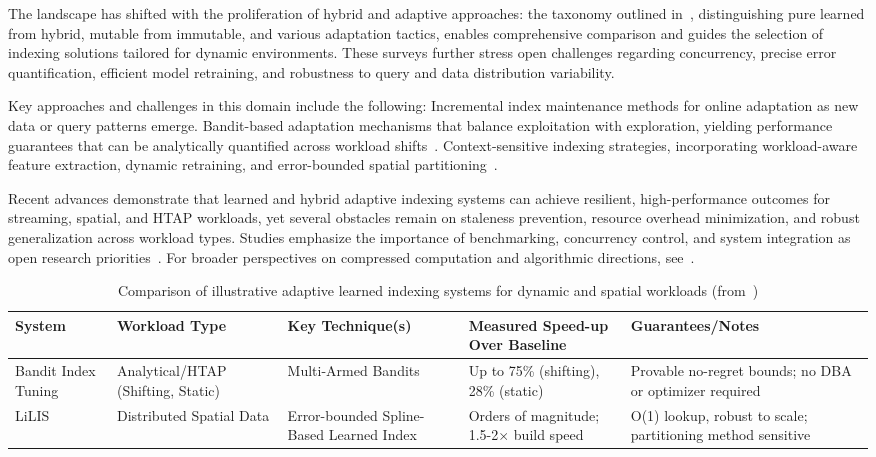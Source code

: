 \documentclass[sigconf]{acmart}
\begin{document}
The landscape has shifted with the proliferation of hybrid and adaptive approaches: the taxonomy outlined in~\cite{ref110}, distinguishing pure learned from hybrid, mutable from immutable, and various adaptation tactics, enables comprehensive comparison and guides the selection of indexing solutions tailored for dynamic environments. These surveys further stress open challenges regarding concurrency, precise error quantification, efficient model retraining, and robustness to query and data distribution variability.

Key approaches and challenges in this domain include the following:
Incremental index maintenance methods for online adaptation as new data or query patterns emerge.
Bandit-based adaptation mechanisms that balance exploitation with exploration, yielding performance guarantees that can be analytically quantified across workload shifts~\cite{ref105}.
Context-sensitive indexing strategies, incorporating workload-aware feature extraction, dynamic retraining, and error-bounded spatial partitioning~\cite{ref111,ref110}.

Recent advances demonstrate that learned and hybrid adaptive indexing systems can achieve resilient, high-performance outcomes for streaming, spatial, and HTAP workloads, yet several obstacles remain on staleness prevention, resource overhead minimization, and robust generalization across workload types. Studies emphasize the importance of benchmarking, concurrency control, and system integration as open research priorities~\cite{ref110}. For broader perspectives on compressed computation and algorithmic directions, see~\cite{ref118}.

\begin{table*}[htbp]
\centering
\caption{Comparison of illustrative adaptive learned indexing systems for dynamic and spatial workloads (from~\cite{ref105,ref111})}
\label{tab:adaptive-index-summary}
\begin{adjustbox}{max width=\textwidth}
\begin{tabular}{@{}lllll@{}}
\toprule
System      & Workload Type & Key Technique(s)     & Measured Speed-up Over Baseline & Guarantees/Notes \\
\midrule
Bandit Index Tuning~\cite{ref105} & Analytical/HTAP (Shifting, Static) & Multi-Armed Bandits   & Up to 75\% (shifting), 28\% (static) & Provable no-regret bounds; no DBA or optimizer required \\
LiLIS~\cite{ref111} & Distributed Spatial Data & Error-bounded Spline-Based Learned Index & Orders of magnitude; 1.5-2$\times$ build speed & O(1) lookup, robust to scale; partitioning method sensitive \\
\bottomrule
\end{tabular}
\end{adjustbox}
\end{table*}
\end{document}
